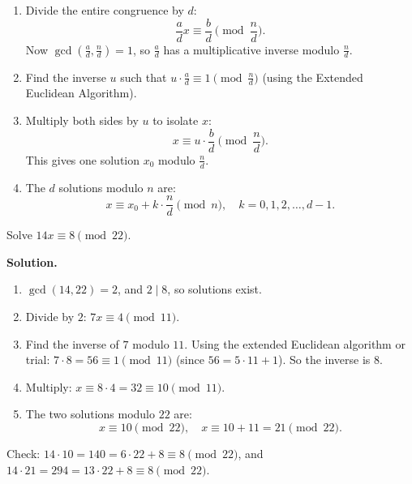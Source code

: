 \documentclass[11pt,a4paper]{article}
\begin{document}
\begin{enumerate}[label=\textbf{Step \arabic*:}]
    \item Divide the entire congruence by $d$:
    \begin{equation*}
        \frac{a}{d} x \equiv \frac{b}{d} \pmod{\frac{n}{d}}.
    \end{equation*}
    Now $\gcd\!\left(\frac{a}{d}, \frac{n}{d}\right) = 1$, so $\frac{a}{d}$ has a multiplicative inverse modulo $\frac{n}{d}$.
    \item Find the inverse $u$ such that $u \cdot \frac{a}{d} \equiv 1 \pmod{\frac{n}{d}}$ (using the Extended Euclidean Algorithm).
    \item Multiply both sides by $u$ to isolate $x$:
    \begin{equation*}
        x \equiv u \cdot \frac{b}{d} \pmod{\frac{n}{d}}.
    \end{equation*}
    This gives one solution $x_0$ modulo $\frac{n}{d}$.
    \item The $d$ solutions modulo $n$ are:
    \begin{equation*}
        x \equiv x_0 + k \cdot \frac{n}{d} \pmod{n}, \quad k = 0, 1, 2, \dots, d-1.
    \end{equation*}
\end{enumerate}

\begin{example}
Solve $14x \equiv 8 \pmod{22}$.

\textbf{Solution.}
\begin{enumerate}[label=--]
    \item $\gcd(14, 22) = 2$, and $2 \mid 8$, so solutions exist.
    \item Divide by $2$: $7x \equiv 4 \pmod{11}$.
    \item Find the inverse of $7$ modulo $11$. Using the extended Euclidean algorithm or trial: $7 \cdot 8 = 56 \equiv 1 \pmod{11}$ (since $56 = 5 \cdot 11 + 1$). So the inverse is $8$.
    \item Multiply: $x \equiv 8 \cdot 4 = 32 \equiv 10 \pmod{11}$.
    \item The two solutions modulo $22$ are:
    \begin{equation*}
        x \equiv 10 \pmod{22}, \quad x \equiv 10 + 11 = 21 \pmod{22}.
    \end{equation*}
\end{enumerate}
Check: $14 \cdot 10 = 140 = 6 \cdot 22 + 8 \equiv 8 \pmod{22}$, and $14 \cdot 21 = 294 = 13 \cdot 22 + 8 \equiv 8 \pmod{22}$.
\end{example}
\end{document}
